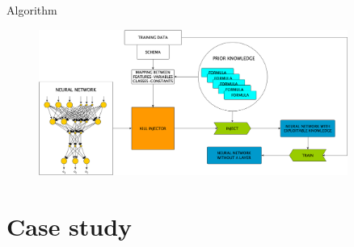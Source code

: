 \documentclass[presentation]{beamer}\mode<presentation>{\usetheme{AMSBolognaFC}}
\begin{document}
\begin{frame}[allowframebreaks]{Algorithm}
    \framebreak
    
    \begin{figure}
        \centering
        \includegraphics[width=0.9\textwidth]{figures/kill.png}
    \end{figure}
    
\end{frame}

\section{Case study}
\end{document}

